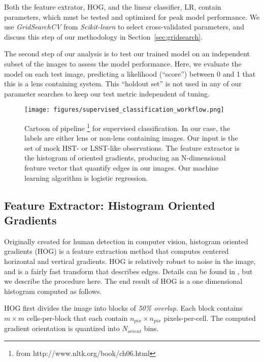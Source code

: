 \documentclass{emulateapj}
\newcommand{\wording}[1]{{\it\color{purple} #1}}
\begin{document}
Both the feature extrator, HOG, and the linear classifier, LR, contain
parameters, which must be tested and optimized for peak model
performance.  We use {\em GridSearchCV} from {\em Scikit-learn} to
select cross-validated parameters, and discuss this step of our
methodology in Section~\ref{sec:gridsearch}.

The second step of our analysis is to test our trained model on an
independent subset of the images to assess the model performance.
Here, we evaluate the model on each test image, predicting a
likelihood (``score'') between 0 and 1 that this is a lens containing
system.  This ``holdout set'' is not used in any of our parameter
searches to keep our test metric independent of tuning.

\begin{figure}[t]\label{fig:pipeline}
\begin{center}
\texttt{[image: figures/supervised\_classification\_workflow.png]}
\caption{Cartoon of pipeline \footnote{from
    http://www.nltk.org/book/ch06.html} for supervised classification.
  In our case, the labels are either lens or non-lens containing
  images.  Our input is the set of mock HST- or LSST-like
  observations.  The feature extractor is the histogram of oriented
  gradients, producing an N-dimensional feature vector that quantify
  edges in our images.  Our machine learning algorithm is logistic
  regression.}
\end{center}
\end{figure}

\subsection{Feature Extractor: Histogram Oriented Gradients}\label{sec:hog}
Originally created for human detection in computer vision, histogram
oriented gradients (HOG) is a feature extraction method that computes
centered horizontal and vertical gradients. HOG is relatively robust
to noise in the image, and is a fairly fast transform that describes
edges.  Details can be found in \citet{dalalandtriggs_05}, but we
describe the procedure here.  The end result of HOG is a one
dimensional histogram computed as follows.

HOG first divides the image into blocks of \wording{50\% overlap}.
Each block contains $m\times m$ cells-per-block that each contain
$n_{pix}\times n_{pix}$ pixels-per-cell.  The computed gradient
orientation is quantized into $N_{orient}$ bins.
\end{document}
